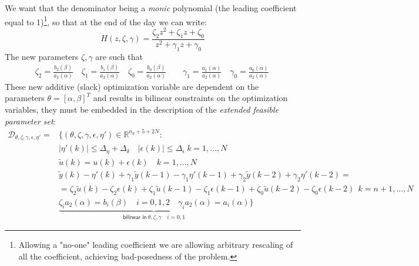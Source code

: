 \noindent
We want that the denominator being a \textit{monic} polynomial (the leading coefficient equal to 1)\footnote{
    Allowing a "no-one" leading coefficient we are allowing arbitrary rescaling of all the coefficient, achieving  bad-posedness of the  problem.
}, so that at the end of the  day we can write:
\begin{equation}
    H(z,\zeta,\gamma)=\frac{\zeta_2z^2+\zeta_1{z}+\zeta_0}{z^2+\gamma_1{z}+\gamma_0}
\end{equation}
\noindent
The new parameters $\zeta, \gamma$ are such that
\begin{equation}
    \begin{aligned}
        &\zeta_2=\frac{b_2(\beta)}{a_2(\alpha)}\quad 
        \zeta_1=\frac{b_1(\beta)}{a_2(\alpha)}\quad
        \zeta_0=\frac{b_0(\beta)}{a_2(\alpha)}\qquad
        \gamma_1=\frac{a_1(\alpha)}{a_2(\alpha)} \quad
        \gamma_0=\frac{a_0(\alpha)}{a_2(\alpha)}\quad
    \end{aligned}
\end{equation}
These new additive (slack) optimization variable are dependent on the parameters $\theta=[\alpha, \beta]^T$ and results in bilinear constraints on the optimization variables, they must be embedded in the description of the \textit{extended feasible parameter set}:
\begin{equation}
    \begin{aligned}
        \mathcal{D}_{\theta,\zeta,\gamma,\epsilon,\eta'}=&\big\{
            (\theta,\zeta,\gamma,\epsilon,\eta')\in\mathbb{R}^{n_\theta+5+2N}:\\
            &  \vert \eta'(k) \vert \le \Delta_\eta+\Delta_\delta \quad
            \vert \epsilon(k) \vert \le \Delta_\epsilon \ k=1,...,N\\
        &\tilde{u}(k)=u(k)+\epsilon(k) \quad k=1,...,N\\
        &\tilde{y}(k)-\eta'(k)+\gamma_1{\tilde{y}(k-1)-\gamma_1\eta'(k-1)+\gamma_2{\tilde{y}(k-2)}+\gamma_2\eta'(k-2)}=\\
        &=\zeta_2\tilde{u}(k)-\zeta_2\epsilon(k)+\zeta_1\tilde{u}(k-1)-\zeta_1\epsilon(k-1)+\zeta_0\tilde{u}(k-2)-\zeta_0\epsilon(k-2) \ \ k=n+1,...,N\\
        &
        \underbrace{\zeta_i a_2(\alpha)=b_i(\beta) \quad i=0,1,2   \quad \gamma_i a_2(\alpha)=a_i(\alpha)}_{\textsf{bilinear in}\  \theta,\zeta,\gamma \quad i=0,1}
    \big\}
    \end{aligned}
\end{equation}

